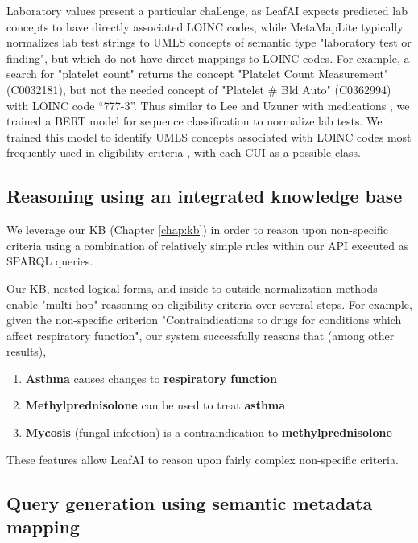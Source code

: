 \documentclass[../main.tex]{subfiles}
\begin{document}
Laboratory values present a particular challenge, as LeafAI expects predicted lab concepts to have directly associated LOINC codes, while MetaMapLite typically normalizes lab test strings to UMLS concepts of semantic type "laboratory test or finding", but which do not have direct mappings to LOINC codes. For example, a search for "platelet count" returns the concept "Platelet Count Measurement" (C0032181), but not the needed concept of "Platelet \# Bld Auto" (C0362994) with LOINC code “777-3”. Thus similar to Lee and Uzuner with medications \cite{lee2020normalizing}, we trained a BERT model for sequence classification to normalize lab tests. We trained this model to identify UMLS concepts associated with LOINC codes most frequently used in eligibility criteria \cite{rafee2022elapro}, with each CUI as a possible class.

\subsection{Reasoning using an integrated knowledge base}

We leverage our KB (Chapter \ref{chap:kb}) in order to reason upon non-specific criteria using a combination of relatively simple rules within our API executed as SPARQL queries.

Our KB, nested logical forms, and inside-to-outside normalization methods enable "multi-hop" reasoning on eligibility criteria over several steps. For example, given the non-specific criterion "Contraindications to drugs for conditions which affect respiratory function", our system successfully reasons that (among other results),

\begin{enumerate}
    \item \textbf{Asthma} causes changes to \textbf{respiratory function}
    \item \textbf{Methylprednisolone} can be used to treat \textbf{asthma}
    \item \textbf{Mycosis} (fungal infection) is a contraindication to \textbf{methylprednisolone}
\end{enumerate}

\noindent These features allow LeafAI to reason upon fairly complex non-specific criteria.

\subsection{Query generation using semantic metadata mapping}
\end{document}
